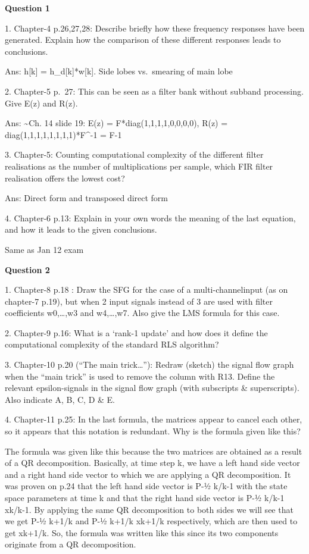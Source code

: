 \documentclass[
  a4paper,
  ,captions=tableheading
]{scrartcl}
\begin{document}
\textbf{Question 1}

1. Chapter-4 p.26,27,28: Describe briefly how these frequency responses
have been generated. Explain how the comparison of these different
responses leads to conclusions.

Ans: h{[}k{]} = h\_d{[}k{]}*w{[}k{]}. Side lobes vs.~smearing of main
lobe

2. Chapter-5 p.~27: This can be seen as a filter bank without subband
processing. Give E(z) and R(z).

Ans: \textasciitilde Ch. 14 slide 19: E(z) = F*diag(1,1,1,1,0,0,0,0),
R(z) = diag(1,1,1,1,1,1,1,1)*F\^{}-1 = F-1

3. Chapter-5: Counting computational complexity of the different filter
realisations as the number of multiplications per sample, which FIR
filter realisation offers the lowest cost?

Ans: Direct form and transposed direct form

4. Chapter-6 p.13: Explain in your own words the meaning of the last
equation, and how it leads to the given conclusions.

Same as Jan 12 exam

\textbf{Question 2}

1. Chapter-8 p.18 : Draw the SFG for the case of a multi-channelinput
(as on chapter-7 p.19), but when 2 input signals instead of 3 are used
with filter coefficients w0,\ldots,w3 and w4,\ldots,w7. Also give the
LMS formula for this case.

2. Chapter-9 p.16: What is a `rank-1 update' and how does it define the
computational complexity of the standard RLS algorithm?

3. Chapter-10 p.20 (``The main trick\ldots''): Redraw (sketch) the
signal flow graph when the ``main trick'' is used to remove the column
with R13. Define the relevant epsilon-signals in the signal flow graph
(with subscripts \& superscripts). Also indicate A, B, C, D \& E.

4. Chapter-11 p.25: In the last formula, the matrices appear to cancel
each other, so it appears that this notation is redundant. Why is the
formula given like this?

The formula was given like this because the two matrices are obtained as
a result of a QR decomposition. Basically, at time step k, we have a
left hand side vector and a right hand side vector to which we are
applying a QR decomposition. It was proven on p.24 that the left hand
side vector is P-½ k/k-1 with the state space parameters at time k and
that the right hand side vector is P-½ k/k-1 xk/k-1. By applying the
same QR decomposition to both sides we will see that we get P-½ k+1/k
and P-½ k+1/k xk+1/k respectively, which are then used to get xk+1/k.
So, the formula was written like this since its two components originate
from a QR decomposition.
\end{document}
